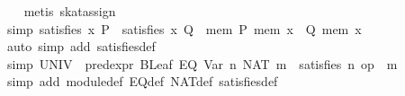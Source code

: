 \begin{isabellebody}
%
\isadelimproof
\ \ %
\endisadelimproof
%
\isatagproof
{}\isamarkupfalse%
\ {}metis\ skat{}assign{}{}%
\endisatagproof
{\isafoldproof}%
%
\isadelimproof
\isanewline
%
\endisadelimproof
\isanewline
{}\isamarkupfalse%
\ {}simp{}{}\ {}satisfies\ x\ P\ {}\ satisfies\ x\ Q\ {}\ {}{}mem{}\ P\ {}mem\ x{}\ {}\ Q\ {}mem\ x{}{}{}\isanewline
%
\isadelimproof
\ \ %
\endisadelimproof
%
\isatagproof
{}\isamarkupfalse%
\ {}auto\ simp\ add{}\ satisfies{}def{}%
\endisatagproof
{\isafoldproof}%
%
\isadelimproof
\isanewline
%
\endisadelimproof
\isanewline
{}\isamarkupfalse%
\ {}simp{}{}\ {}UNIV\ {}\ pred{}expr\ {}BLeaf\ {}EQ\ {}Var\ n{}\ {}NAT\ m{}{}{}\ {}\ satisfies\ n\ {}op\ {}\ m{}{}\isanewline
%
\isadelimproof
\ \ %
\endisadelimproof
%
\isatagproof
{}\isamarkupfalse%
\ {}simp\ add{}\ module{}def\ EQ{}def\ NAT{}def\ satisfies{}def{}\isanewline

\end{isabellebody}
